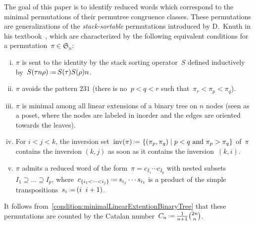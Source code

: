 \documentclass[ALCO]{cedram}
\newcommand{\fS}{\mathfrak{S}}
\newcommand{\set}[2]{\left\{ #1 \;\middle|\; #2 \right\}}
\newcommand{\eqdef}{\mbox{\,\raisebox{0.2ex}{\scriptsize\ensuremath{\mathrm:}}\ensuremath{=}\,}}
\newcommand{\defn}[1]{\textsl{\color{darkblue} #1}}
\DeclareMathOperator{\inv}{inv}
\begin{document}
The goal of this paper is to identify reduced words which correspond to the minimal permutations of their permutree congruence classes.
These permutations are generalizations of the \defn{stack-sortable} permutations introduced by D.~Knuth in his textbook~\cite[Sect.~2.2.1]{Knuth-TAOCP1}, which are characterized by the following equivalent conditions for a permutation~$\pi \in \fS_n$:
\begin{enumerate}[(i)]
\item \label{condition:stackSorting}
$\pi$ is sent to the identity by the stack sorting operator~$S$ defined inductively by~$S(\tau n \rho) \eqdef S(\tau) S(\rho) n$.
\item \label{condition:patternStack}
$\pi$ avoids the pattern $231$ (\ie there is no~$p < q < r$ such that~$\pi_r < \pi_p < \pi_q$).
\item \label{condition:minimalLinearExtentionBinaryTree}
$\pi$ is minimal among all linear extensions of a binary tree on $n$ nodes (seen as a poset, where the nodes are labeled in inorder and the edges are oriented towards the leaves).
\item \label{condition:alignedStack}
For $i < j < k$, the inversion set~$\inv(\pi) \eqdef \set{(\pi_p, \pi_q)}{p < q \text{ and } \pi_p > \pi_q}$ of~$\pi$ contains the inversion $(k,j)$ as soon as it contains the inversion~$(k,i)$.
\item \label{condition:sortableStack}
$\pi$ admits a reduced word of the form~$\pi = c_{I_1} \cdots c_{I_p}$ with nested subsets ${I_1 \supseteq \dots \supseteq I_p}$, where~$c_{\{i_1 < \dots < i_j\}} \eqdef s_{i_j} \cdots s_{i_1}$ is a product of the simple transpositions~$s_i \eqdef (i \;\; i+1)$.
\end{enumerate}
It follows from~\ref{condition:minimalLinearExtentionBinaryTree} that these permutations are counted by the Catalan number~$C_n \eqdef \frac{1}{n+1} \binom{2n}{n}$.
\end{document}
